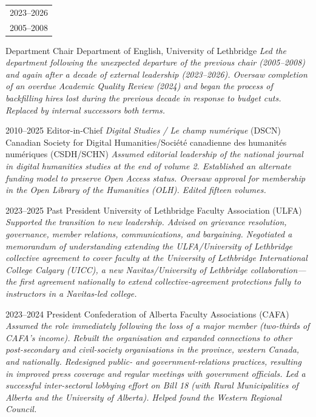 \documentclass[11pt,letterpaper,sans]{moderncv}
\begin{document}
{\cventry
  {\begin{tabular}[t]{@{}r@{}}2023--2026\\2005--2008\end{tabular}}
  {Department Chair}
  {Department of English, University of Lethbridge}
  {}
  {}
  {\textit{Led the department following the unexpected departure of the previous chair (2005--2008) and again after a decade of external leadership (2023--2026). Oversaw completion of an overdue Academic Quality Review (2024) and began the process of backfilling hires lost during the previous decade in response to budget cuts. Replaced by internal successors both terms.}}

\cventry
  {2010--2025}
  {Editor-in-Chief}
  {\textit{Digital Studies / Le champ numérique} (DSCN)}
  {Canadian Society for Digital Humanities/Société canadienne des humanités numériques (CSDH/SCHN)}
  {}
  {\textit{Assumed editorial leadership of the national journal in digital humanities studies at the end of volume 2. Established an alternate funding model to preserve Open Access status. Oversaw approval for membership in the Open Library of the Humanities (OLH). Edited fifteen volumes.}}

\cventry
  {2023--2025}
  {Past President}
  {University of Lethbridge Faculty Association (ULFA)}
  {}
  {}
  {\textit{Supported the transition to new leadership. Advised on grievance resolution, governance, member relations, communications, and bargaining. Negotiated a memorandum of understanding extending the ULFA/University of Lethbridge collective agreement to cover faculty at the University of Lethbridge International College Calgary (UICC), a new Navitas/University of Lethbridge collaboration---the first agreement nationally to extend collective-agreement protections fully to instructors in a Navitas-led college.}}

\cventry
  {2023--2024}
  {President}
  {Confederation of Alberta Faculty Associations (CAFA)}
  {}
  {}
  {\textit{Assumed the role immediately following the loss of a major member (two-thirds of CAFA’s income). Rebuilt the organisation and expanded connections to other post-secondary and civil-society organisations in the province, western Canada, and nationally. Redesigned public- and government-relations practices, resulting in improved press coverage and regular meetings with government officials. Led a successful inter-sectoral lobbying effort on Bill 18 (with Rural Municipalities of Alberta and the University of Alberta). Helped found the Western Regional Council.}}

}
\end{document}
